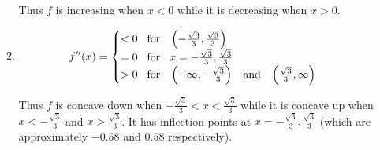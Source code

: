 \documentclass[12pt]{amsart}
\begin{document}
\begin{enumerate}
\begin{enumerate}
			Thus $f$ is increasing when $x<0$ while it is decreasing when $x>0$.
			\item 
				\begin{align}
					f''(x)=
					\begin{cases}
						< 0 \hspace{0.3cm} \text{for} \hspace{0.3cm} \left(-\frac{\sqrt{3}}{3},
						\frac{\sqrt{3}}{3}\right) \notag \\
						= 0 \hspace{0.3cm} \text{for} \hspace{0.3cm} x=-\frac{\sqrt{3}}{3}, 
						\frac{\sqrt{3}}{3} \notag \\
						> 0 \hspace{0.3cm} \text{for} \hspace{0.3cm}\left(-\infty,-\frac{\sqrt{3}}{3}\right)
						\hspace{0.3cm} \text{and} \hspace{0.3cm} \left(\frac{\sqrt{3}}{3},\infty\right) 							\notag
					\end{cases}
				\end{align}
				
			Thus $f$ is concave down when $-\frac{\sqrt{3}}{3}<x<\frac{\sqrt{3}}{3}$ while it is concave up 
			when $x<-\frac{\sqrt{3}}{3}$ and $x>\frac{\sqrt{3}}{3}$. It has inflection points at 
			$x=-\frac{\sqrt{3}}{3}, \frac{\sqrt{3}}{3}$ (which are approximately $-0.58$ and $0.58$ 					respectively). \\
			

\end{enumerate}
\end{enumerate}
\end{document}

